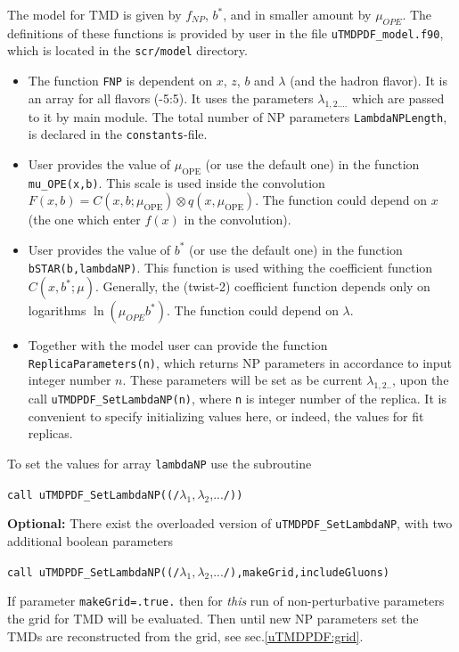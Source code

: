 \documentclass[prd,nofootinbib,eqsecnum,final]{revtex4}
\renewcommand{\(}{\left(}
\renewcommand{\)}{\right)}
\renewcommand{\[}{\left[}
\renewcommand{\]}{\right]}
\begin{document}
The model for TMD is given by $f_{NP}$, $b^*$, and in smaller amount by $\mu_{OPE}$. The definitions of these functions is provided by user in the file \texttt{uTMDPDF\_model.f90}, which is located in the \texttt{scr/model} directory.

\begin{itemize}
\item The function \texttt{FNP} is dependent on $x$, $z$, $b$ and $\lambda$ (and the hadron flavor). It is an array for all flavors (-5:5). It uses the parameters $\lambda_{1,2....}$ which are passed to it by main module. The total number of NP parameters \texttt{LambdaNPLength}, is declared in the \texttt{constants}-file.
\item User provides the value of $\mu_\text{OPE}$ (or use the default one) in the function \texttt{mu{\_}OPE(x,b)}. This scale is used inside the convolution $F(x,b)=C(x,b;\mu_\text{OPE})\otimes q(x,\mu_\text{OPE})$. The function could depend on $x$ (the one which enter $f(x)$ in the convolution).
\item User provides the value of $b^*$ (or use the default one) in the function \texttt{bSTAR(b,lambdaNP)}. This function is used withing the coefficient function $C(x,b^*;\mu)$. Generally, the (twist-2) coefficient function depends only on logarithms $\ln(\mu_{OPE}b^*)$. The function could depend on $\lambda$.
\item Together with the model user can provide the function \texttt{ReplicaParameters(n)}, which returns NP parameters in accordance to input integer number $n$. These parameters will be set as be current $\lambda_{1,2..}$, upon the call \texttt{uTMDPDF{\_}SetLambdaNP(n)}, where \texttt{n} is integer number of the replica. It is convenient to specify initializing values here, or indeed, the values for fit replicas.
\end{itemize}



To set the values for array \texttt{lambdaNP} use the subroutine

\texttt{call uTMDPDF{\_}SetLambdaNP((/}$\lambda_1,\lambda_2$,...\texttt{/))}

\textbf{Optional:} There exist the overloaded version of \texttt{uTMDPDF{\_}SetLambdaNP}, with two additional boolean parameters

\texttt{call uTMDPDF{\_}SetLambdaNP((/}$\lambda_1,\lambda_2$,...\texttt{/),makeGrid,includeGluons)}

If parameter \texttt{makeGrid=.true.} then for \textit{this} run of non-perturbative parameters the grid for TMD will be evaluated. Then until new NP parameters set the TMDs are reconstructed from the grid, see sec.\ref{uTMDPDF:grid}.
\end{document}
